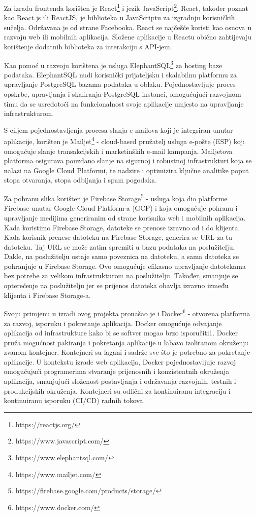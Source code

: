 			 Za izradu frontenda korišten je React\footnote{https://reactjs.org/} i jezik JavaScript\footnote{https://www.javascript.com/}. React, također poznat kao React.js ili ReactJS, je biblioteka u JavaScriptu za izgradnju korisničkih sučelja. Održavana je od strane Facebooka. React se najčešće koristi kao osnova u razvoju web ili mobilnih aplikacija. Složene aplikacije u Reactu obično zahtijevaju korištenje dodatnih biblioteka za interakciju s API-jem.

			 Kao pomoć u razvoju korištena je usluga ElephantSQL\footnote{https://www.elephantsql.com/} za hosting baze podataka. ElephantSQL nudi korisnički prijateljsku i skalabilnu platformu za upravljanje PostgreSQL bazama podataka u oblaku. Pojednostavljuje proces opskrbe, upravljanja i skaliranja PostgreSQL instanci, omogućujući razvojnom timu da se usredotoči na funkcionalnost svoje aplikacije umjesto na upravljanje infrastrukturom.

			 S ciljem pojednostavljenja procesa slanja e-mailova koji je integriran unutar aplikacije, korišten je Mailjet\footnote{https://www.mailjet.com/} - cloud-based pružatelj usluga e-pošte (ESP) koji omogućuje slanje transakcijskih i marketinških e-mail kampanja. Mailjetova platforma osigurava pouzdano slanje na sigurnoj i robustnoj infrastrukturi koja se nalazi na Google Cloud Platformi, te nadzire i optimizira ključne analitike poput stopa otvaranja, stopa odbijanja i spam pogodaka.

			 Za pohranu slika korišten je Firebase Storage\footnote{https://firebase.google.com/products/storage/} - usluga koja dio platforme Firebase unutar Google Cloud Platform-a (GCP) i koja omogućuje pohranu i upravljanje medijima generiranim od strane korisnika web i mobilnih aplikacija. Kada koristimo Firebase Storage, datoteke se prenose izravno od i do klijenta. Kada korisnik prenese datoteku na Firebase Storage, generira se URL za tu datoteku. Taj URL se može zatim spremiti u bazu podataka na poslužitelju. Dakle, na poslužitelju ostaje samo poveznica na datoteku, a sama datoteka se pohranjuje u Firebase Storage. Ovo omogućuje efikasno upravljanje datotekama bez potrebe za velikom infrastrukturom na poslužitelju. Također, smanjuje se opterećenje na poslužitelju jer se prijenos datoteka obavlja izravno između klijenta i Firebase Storage-a.

			 Svoju primjenu u izradi ovog projekta pronašao je i Docker\footnote{https://www.docker.com/} - otvorena platforma za razvoj, isporuku i pokretanje aplikacija. Docker omogućuje odvajanje aplikacija od infrastrukture kako bi se softver mogao brzo isporučiti1. Docker pruža mogućnost pakiranja i pokretanja aplikacije u labavo izoliranom okruženju zvanom kontejner. Kontejneri su lagani i sadrže sve što je potrebno za pokretanje aplikacije. U kontekstu izrade web aplikacija, Docker pojednostavljuje razvoj omogućujući programerima stvaranje prijenosnih i konzistentnih okruženja aplikacija, smanjujući složenost postavljanja i održavanja razvojnih, testnih i produkcijskih okruženja. Kontejneri su odlični za kontinuiranu integraciju i kontinuiranu isporuku (CI/CD) radnih tokova.

